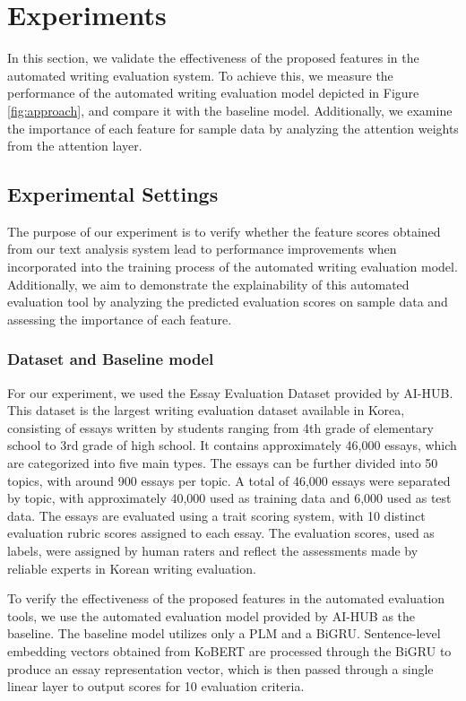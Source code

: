 \section{Experiments}
\label{sec:05_experiments}
In this section, we validate the effectiveness of the proposed features in the automated writing evaluation system. 
To achieve this, we measure the performance of the automated writing evaluation model depicted in Figure \ref{fig:approach}, and compare it with the baseline model. 
Additionally, we examine the importance of each feature for sample data by analyzing the attention weights from the attention layer.






\subsection{Experimental Settings \label{sec:setting}}
{The purpose of our experiment is to verify whether the feature scores obtained from our text analysis system lead to performance improvements when incorporated into the training process of the automated writing evaluation model. Additionally, we aim to demonstrate the explainability of this automated evaluation tool by analyzing the predicted evaluation scores on sample data and assessing the importance of each feature.}


\subsubsection*{Dataset and Baseline model\label{sec:dataset}}
{For our experiment, we used the \textsf{Essay Evaluation Dataset} provided by \textsf{AI-HUB}. This dataset is the largest writing evaluation dataset available in Korea, consisting of essays written by students ranging from 4th grade of elementary school to 3rd grade of high school. It contains approximately 46,000 essays, which are categorized into five main types. The essays can be further divided into 50 topics, with around 900 essays per topic. A total of 46,000 essays were separated by topic, with approximately 40,000 used as training data and 6,000 used as test data. The essays are evaluated using a trait scoring system, with 10 distinct evaluation rubric scores assigned to each essay. The evaluation scores, used as labels, were assigned by human raters and reflect the assessments made by reliable experts in Korean writing evaluation.}

{To verify the effectiveness of the proposed features in the automated evaluation tools, we use the automated evaluation model provided by \textsf{AI-HUB} as the baseline. The baseline model utilizes only a PLM and a BiGRU. Sentence-level embedding vectors obtained from KoBERT are processed through the BiGRU to produce an essay representation vector, which is then passed through a single linear layer to output scores for 10 evaluation criteria.}

